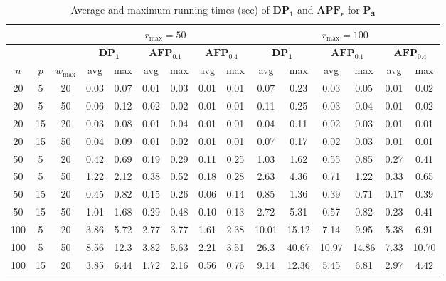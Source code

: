 \documentclass[12pt]{article}
\begin{document}
\begin{sloppypar}
\begin{table}[H]
\footnotesize  
\setlength{\tabcolsep}{2 pt} %
\caption{Average and maximum running times (sec) of $\mathbf{DP_1}$ and $\mathbf{APF_{\epsilon}}$ for  $\mathbf{P_3}$}  \label{TA-D3} 
\vspace{-10pt}
\begin{center}
\begin{tabular}{|ccc|cc|cc|cc|cc|cc|cc|}  \hline
\multicolumn{3}{|c|}{} & \multicolumn{6}{c|}{$r_{\max}=50$} & \multicolumn{6}{c|}{$r_{\max}=100$}\\ \hline
\multicolumn{3}{|c|}{} & \multicolumn{2}{c|}{$\mathbf{DP_1}$} & \multicolumn{2}{c|}{$\mathbf{AFP_{0.1}}$} & \multicolumn{2}{c|}{$\mathbf{AFP_{0.4}}$} & \multicolumn{2}{c|}{$\mathbf{DP_1}$} & \multicolumn{2}{c|}{$\mathbf{AFP_{0.1}}$} & \multicolumn{2}{c|}{$\mathbf{AFP_{0.4}}$} \\ \hline
$n$ & $p$ & $w_{\max}$&   avg & max  & avg & max & avg & max &avg & max & avg & max & avg & max \\ \hline
20 & 5 & 20 & 0.03 & 0.07 &	0.01 & 0.03	& 0.01 & 0.01 & 0.07 & 0.23 & 0.03 & 0.05 &	0.01 & 0.02 \\ \hline
20 & 5 & 50 & 0.06 & 0.12 &	0.02 & 0.02 & 0.01 & 0.01 & 0.11 & 0.25 & 0.03 & 0.04 &	0.01 & 0.02 \\ \hline
20 & 15 & 20 & 0.03 & 0.08 & 0.01 &	0.04 & 0.01 & 0.01 & 0.04 &	0.11 & 0.02 & 0.03 & 0.01 &	0.01 \\ \hline
20 & 15 & 50 & 0.04 & 0.09 & 0.01 &	0.02 & 0.01 & 0.01 & 0.07 &	0.17 & 0.02 & 0.03 & 0.01 &	0.01 \\ \hline
50 & 5 & 20 & 0.42 & 0.69 &	0.19 & 0.29 & 0.11 & 0.25 & 1.03 & 1.62 & 0.55 & 0.85 &	0.27 & 0.41 \\ \hline
50 & 5 & 50 & 1.22 & 2.12 &	0.38 & 0.52 & 0.18 & 0.28 & 2.63 & 4.36 & 0.71 & 1.22 &	0.33 & 0.65 \\ \hline
50 & 15 & 20 & 0.45 & 0.82 & 0.15 & 0.26 & 0.06 & 0.14 & 0.85 &	1.36 & 0.39 & 0.71 & 0.17 &	0.39 \\ \hline
50 & 15 & 50 & 1.01 & 1.68 & 0.29 &	0.48 & 0.10 & 0.13 & 2.72 &	5.31 & 0.57 & 0.82 & 0.23 &	0.41 \\ \hline 
100 & 5 & 20 & 3.86 & 5.72 & 2.77 &	3.77 & 1.61 & 2.38 & 10.01 & 15.12 & 7.14 &	9.95 & 5.38 & 6.91 \\ \hline
100 & 5 & 50 & 8.56 & 12.3 & 3.82 &	5.63 & 2.21 & 3.51 & 26.3 &	40.67 &	10.97 &	14.86 &	7.33 & 10.70 \\ \hline
100 & 15 & 20 & 3.85 & 6.44 & 1.72 & 2.16 &	0.56 & 0.76 & 9.14 & 12.36 & 5.45 &	6.81 & 2.97 & 4.42 \\ \hline

\end{tabular}
\end{center}
\end{table}
\end{sloppypar}
\end{document}
